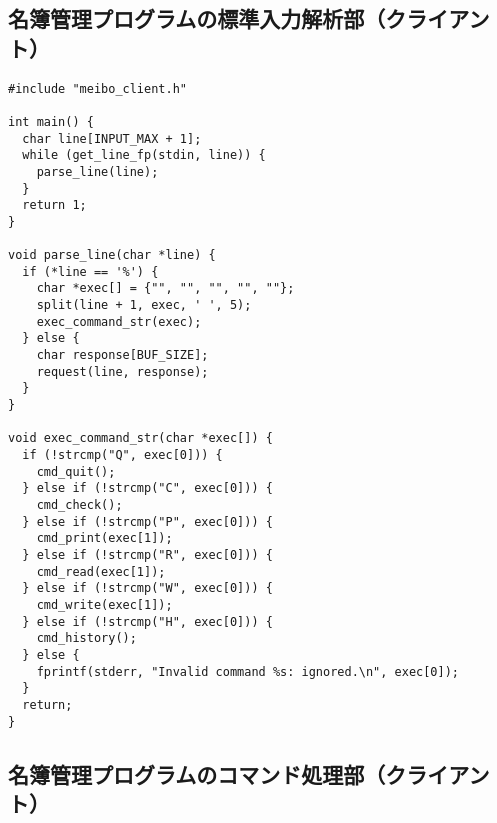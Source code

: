 \documentclass[11pt]{jsarticle}
\begin{document}
\subsection{名簿管理プログラムの標準入力解析部（クライアント）} \label{sec:meibo_client.c}

\begin{verbatim}
#include "meibo_client.h"

int main() {
  char line[INPUT_MAX + 1];
  while (get_line_fp(stdin, line)) {
    parse_line(line);
  }
  return 1;
}

void parse_line(char *line) {
  if (*line == '%') {
    char *exec[] = {"", "", "", "", ""};
    split(line + 1, exec, ' ', 5);
    exec_command_str(exec);
  } else {
    char response[BUF_SIZE];
    request(line, response);
  }
}

void exec_command_str(char *exec[]) {
  if (!strcmp("Q", exec[0])) {
    cmd_quit();
  } else if (!strcmp("C", exec[0])) {
    cmd_check();
  } else if (!strcmp("P", exec[0])) {
    cmd_print(exec[1]);
  } else if (!strcmp("R", exec[0])) {
    cmd_read(exec[1]);
  } else if (!strcmp("W", exec[0])) {
    cmd_write(exec[1]);
  } else if (!strcmp("H", exec[0])) {
    cmd_history();
  } else {
    fprintf(stderr, "Invalid command %s: ignored.\n", exec[0]);
  }
  return;
}

\end{verbatim}

\subsection{名簿管理プログラムのコマンド処理部（クライアント）} \label{sec:commands.c}
\end{document}
